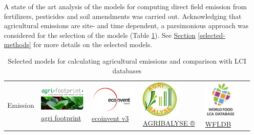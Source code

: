 \documentclass[openany]{book}
\begin{document}
A state of the art analysis of the models for computing direct field emission from fertilizers, pesticides and soil amendments was carried out. Acknowledging that agricultural emissions are site- and time dependent, a parsimonious approach was considered for the selection of the models (Table \ref{tab:agec-models}). See \protect\hyperlink{selected-methods}{Section} \ref{selected-methods} for more details on the selected models.

\begin{longtable}[]{@{}llllll@{}}
\caption{\label{tab:agec-models} Selected models for calculating agricultural emissions and comparison with LCI databases}\tabularnewline
\toprule
\begin{minipage}[b]{0.12\columnwidth}\raggedright
Emission\strut
\end{minipage} & \begin{minipage}[b]{0.16\columnwidth}\raggedright
\includegraphics{Figures/agri-footprint.png} \href{https://www.agri-footprint.com/}{agri footprint} \citep{durlinger2017}\strut
\end{minipage} & \begin{minipage}[b]{0.12\columnwidth}\raggedright
\includegraphics{Figures/ecoinvent.png} \href{https://www.ecoinvent.org/}{ecoinvent v3} \citep{nemecek2011}\strut
\end{minipage} & \begin{minipage}[b]{0.13\columnwidth}\raggedright
\includegraphics{Figures/agribalyse.png} \href{https://www.ademe.fr/en/expertise/alternative-approaches-to-production/agribalyse-program}{AGRIBALYSE ®} \citep{Koch2015}\strut
\end{minipage} & \begin{minipage}[b]{0.12\columnwidth}\raggedright
\includegraphics{Figures/WFLDB.png} \href{https://quantis-intl.com/tools/databases/wfldb-food/}{WFLDB} \citep{nemecek2014}\strut

\end{minipage}
\end{longtable}
\end{document}
